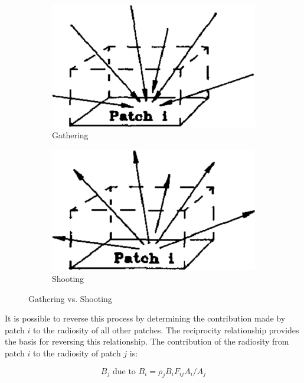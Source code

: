 \begin{figure}
	\begin{subfigure}[b]{.48\textwidth}
		\includegraphics[width=1.\textwidth]{graphics/gi/path-35-1}
		\caption{Gathering}
	\end{subfigure}
	\begin{subfigure}[b]{.48\textwidth}
		\includegraphics[width=1.\textwidth]{graphics/gi/path-35-2}
		\caption{Shooting}
	\end{subfigure}
	\caption{Gathering vs. Shooting}	
	\label{f:gathering-and-shooting}
\end{figure}

It is possible to reverse this process by determining the contribution made by patch $i$ to the radiosity of all other patches. The reciprocity relationship provides the basis for reversing this relationship. The contribution of the radiosity from patch $i$ to the radiosity of patch $j$ is:

\begin{equation}
	B_j\text{ due to }B_i=\rho_j B_iF_{ij}A_i/A_j
\end{equation}

